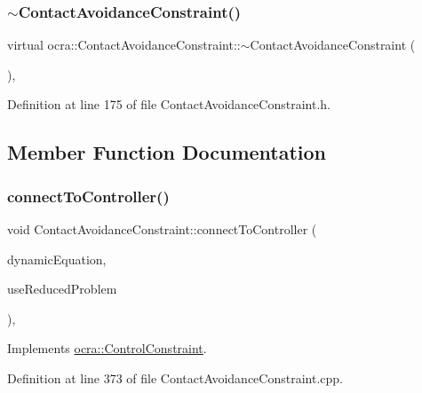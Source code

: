 \subsubsection{\texorpdfstring{$\sim$\+Contact\+Avoidance\+Constraint()}{~ContactAvoidanceConstraint()}}
{\footnotesize\ttfamily virtual ocra\+::\+Contact\+Avoidance\+Constraint\+::$\sim$\+Contact\+Avoidance\+Constraint (\begin{DoxyParamCaption}{ }\end{DoxyParamCaption})\hspace{0.3cm}{\ttfamily [inline]}, {\ttfamily [virtual]}}



Definition at line 175 of file Contact\+Avoidance\+Constraint.\+h.



\subsection{Member Function Documentation}
\hypertarget{classocra_1_1ContactAvoidanceConstraint_a9beada2720203ab46265f271309a2ab5}{}\label{classocra_1_1ContactAvoidanceConstraint_a9beada2720203ab46265f271309a2ab5} 
\subsubsection{\texorpdfstring{connect\+To\+Controller()}{connectToController()}}
{\footnotesize\ttfamily void Contact\+Avoidance\+Constraint\+::connect\+To\+Controller (\begin{DoxyParamCaption}\item[{const \hyperlink{classocra_1_1FullDynamicEquationFunction}{Full\+Dynamic\+Equation\+Function} \&}]{dynamic\+Equation,  }\item[{bool}]{use\+Reduced\+Problem }\end{DoxyParamCaption})\hspace{0.3cm}{\ttfamily [protected]}, {\ttfamily [virtual]}}



Implements \hyperlink{classocra_1_1ControlConstraint_a04dabdc1c469146e7b3240dfe0a5172c}{ocra\+::\+Control\+Constraint}.



Definition at line 373 of file Contact\+Avoidance\+Constraint.\+cpp.

